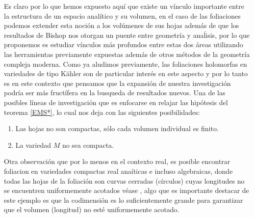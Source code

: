 \documentclass[letterpaper]{report}
\begin{document}
Es claro por lo que hemos expuesto aqu\'i que existe un v\'inculo importante entre la estructura de un espacio anal\'itico y su volumen,
en el caso de las foliaciones podemos extender esta noci\'on a los vol\'umenes de sus hojas adem\'as de que los resultados de Bishop 
nos otorgan un puente entre geometr\'ia y ana\'lisis, por lo que proponemos es estudiar v\'inculos m\'as profundos entre estas
dos \'areas utilizando las herramientas previamente expuestas adem\'as de otros m\'etodos de la geometr\'ia compleja moderna.
Como ya aludimos previamente, las foliaciones holomorfas en variedades de tipo K\"ahler son de particular inter\'es en este aspecto
y por lo tanto es en este contexto que pensamos que la expansi\'on de nuestra investigaci\'on podr\'ia ser m\'as fruct\'ifera en la
busqueda de resultados nuevos. Una de las posibles l\'ineas de investigaci\'on que es enfocarse en relajar las hip\'otesis del 
teorema \ref{EMS*}, lo cual nos deja con las siguientes posibilidades:
\begin{enumerate}
        \item Las hojas no son compactas, s\'olo cada volumen individual es finito.
        \item La variedad $M$ no sea compacta.
\end{enumerate}
Otra observaci\'on que por lo menos en el contexto real, es posible encontrar foliacion en variedades compactas real ana\'iticas e
incluso algebraicas, donde todas las hojas de la foliaci\'on son curvas cerradas (c\'irculos) cuyas longitudes no se encuentren 
uniformemente acotados v\'ease \cite{E-V}, algo que es importante destacar de este ejemplo es que la codimensi\'on es lo
suficientemente grande para garantizar que el volumen (longitud) no est\'e uniformemente acotado.
\end{document}
